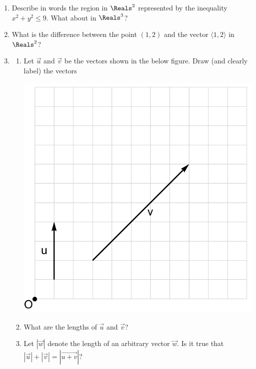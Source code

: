 \documentclass[12pt]{article}
\begin{document}
\begin{enumerate}[resume]
	\newpage
	
	\item Describe in words the region in $\Reals^2$ represented by the inequality $x^2+y^2\leq 9$. What about in $\Reals^3$?
	
	\item What is the difference between the point $(1,2)$ and the vector $\langle 1,2\rangle$ in $\Reals^2$?
	
	\item \begin{enumerate}[itemsep=0.4in]
		\item Let $\vec{u}$ and $\vec{v}$ be the vectors shown in the below figure. Draw (and clearly label) the vectors \begin{enumerate*}[label=(\roman*)]\item $\vec{u+v}$, \item $3\vec{u}$, and \item $\vec{v}/2$.\end{enumerate*}
		\begin{center}
			\includegraphics[scale=0.625]{img1}
		\end{center}
		\vspace{-0.4in}
		\item What are the lengths of $\vec{u}$ and $\vec{v}$? 
		\item Let $|\vec{w}|$ denote the length of an arbitrary vector $\vec{w}$. Is it true that $|\vec{u}|+|\vec{v}|=|\vec{u+v}|$?

\end{enumerate}
\end{enumerate}
\end{document}
